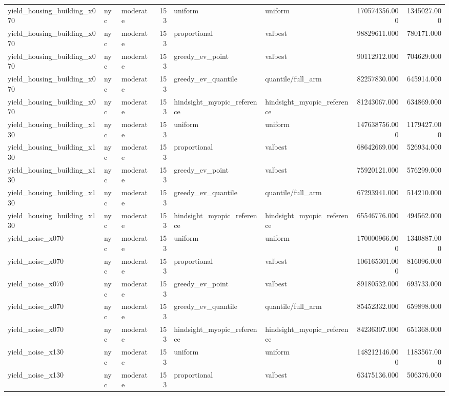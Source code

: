 \begin{tabular}{lllrllrr}
yield\_housing\_building\_x070 & nyc & moderate & 153 & uniform & uniform & 170574356.000 & 1345027.000 \\
yield\_housing\_building\_x070 & nyc & moderate & 153 & proportional & valbest & 98829611.000 & 780171.000 \\
yield\_housing\_building\_x070 & nyc & moderate & 153 & greedy\_ev\_point & valbest & 90112912.000 & 704629.000 \\
yield\_housing\_building\_x070 & nyc & moderate & 153 & greedy\_ev\_quantile & quantile/full\_arm & 82257830.000 & 645914.000 \\
yield\_housing\_building\_x070 & nyc & moderate & 153 & hindsight\_myopic\_reference & hindsight\_myopic\_reference & 81243067.000 & 634869.000 \\
yield\_housing\_building\_x130 & nyc & moderate & 153 & uniform & uniform & 147638756.000 & 1179427.000 \\
yield\_housing\_building\_x130 & nyc & moderate & 153 & proportional & valbest & 68642669.000 & 526934.000 \\
yield\_housing\_building\_x130 & nyc & moderate & 153 & greedy\_ev\_point & valbest & 75920121.000 & 576299.000 \\
yield\_housing\_building\_x130 & nyc & moderate & 153 & greedy\_ev\_quantile & quantile/full\_arm & 67293941.000 & 514210.000 \\
yield\_housing\_building\_x130 & nyc & moderate & 153 & hindsight\_myopic\_reference & hindsight\_myopic\_reference & 65546776.000 & 494562.000 \\
yield\_noise\_x070 & nyc & moderate & 153 & uniform & uniform & 170000966.000 & 1340887.000 \\
yield\_noise\_x070 & nyc & moderate & 153 & proportional & valbest & 106165301.000 & 816096.000 \\
yield\_noise\_x070 & nyc & moderate & 153 & greedy\_ev\_point & valbest & 89180532.000 & 693733.000 \\
yield\_noise\_x070 & nyc & moderate & 153 & greedy\_ev\_quantile & quantile/full\_arm & 85452332.000 & 659898.000 \\
yield\_noise\_x070 & nyc & moderate & 153 & hindsight\_myopic\_reference & hindsight\_myopic\_reference & 84236307.000 & 651368.000 \\
yield\_noise\_x130 & nyc & moderate & 153 & uniform & uniform & 148212146.000 & 1183567.000 \\
yield\_noise\_x130 & nyc & moderate & 153 & proportional & valbest & 63475136.000 & 506376.000 \\

\end{tabular}
